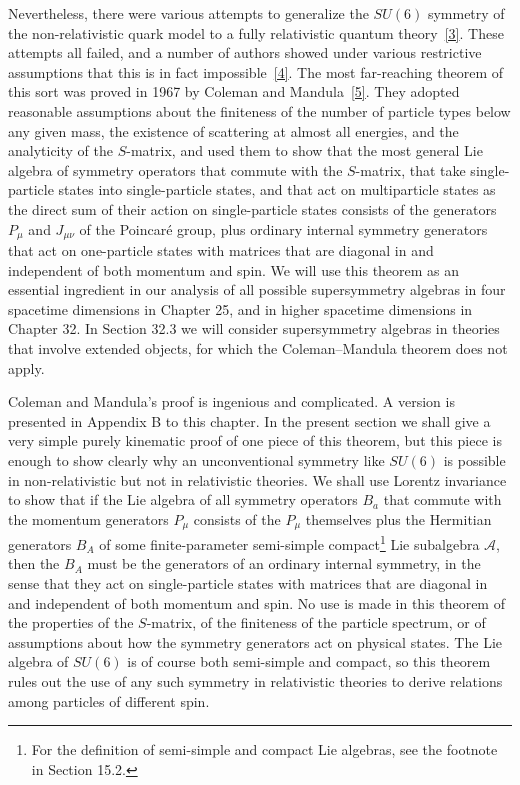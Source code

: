 Nevertheless, there were various attempts to generalize the $SU(6)$ symmetry
of the non-relativistic quark model to a fully relativistic quantum
theory~\hyperref[ch24-ref-3]{[3]}. These attempts all failed, and a number of
authors showed under various restrictive assumptions that this is in fact
impossible~\hyperref[ch24-ref-4]{[4]}. The most far-reaching theorem of this
sort was proved in 1967 by Coleman and Mandula~\hyperref[ch24-ref-5]{[5]}. They
adopted reasonable assumptions about the finiteness of the number of particle
types below any given mass, the existence of scattering at almost all energies,
and the analyticity of the $S$-matrix, and used them to show that the most
general Lie algebra of symmetry operators that commute with the $S$-matrix,
that take single-particle states into single-particle states, and that act on
multiparticle states as the direct sum of their action on single-particle
states consists of the generators $P_\mu$ and $J_{\mu\nu}$ of the Poincar\'e
group, plus ordinary internal symmetry generators that act on one-particle
states with matrices that are diagonal in and independent of both momentum and
spin. We will use this theorem as an essential ingredient in our analysis of
all possible supersymmetry algebras in four spacetime dimensions in Chapter 25,
and in higher spacetime dimensions in Chapter 32. In Section 32.3 we will
consider supersymmetry algebras in theories that involve extended objects, for
which the Coleman--Mandula theorem does not apply.

Coleman and Mandula's proof is ingenious and complicated. A version is
presented in Appendix B to this chapter. In the present section we shall give a
very simple purely kinematic proof of one piece of this theorem, but this piece
is enough to show clearly why an unconventional symmetry like $SU(6)$ is
possible in non-relativistic but not in relativistic theories. We shall use
Lorentz invariance to show that if the Lie algebra of all symmetry operators
$B_a$ that commute with the momentum generators $P_\mu$ consists of the
$P_\mu$ themselves plus the Hermitian generators $B_A$ of some
finite-parameter semi-simple compact\footnote{For the definition of
semi-simple and compact Lie algebras, see the footnote in Section 15.2.} Lie
subalgebra $\mathcal{A}$, then the $B_A$ must be the generators of an ordinary
internal symmetry, in the sense that they act on single-particle states with
matrices that are diagonal in and independent of both momentum and spin. No use
is made in this theorem of the properties of the $S$-matrix, of the finiteness
of the particle spectrum, or of assumptions about how the symmetry generators
act on physical states. The Lie algebra of $SU(6)$ is of course both
semi-simple and compact, so this theorem rules out the use of any such symmetry
in relativistic theories to derive relations among particles of different
spin.

